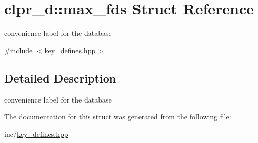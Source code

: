 \hypertarget{structclpr__d_1_1max__fds}{\section{clpr\-\_\-d\-:\-:max\-\_\-fds \-Struct \-Reference}
\label{structclpr__d_1_1max__fds}
}


convenience label for the database  




{\ttfamily \#include $<$key\-\_\-defines.\-hpp$>$}



\subsection{\-Detailed \-Description}
convenience label for the database 

\-The documentation for this struct was generated from the following file\-:\begin{DoxyCompactItemize}
\item 
inc/\hyperlink{key__defines_8hpp}{key\-\_\-defines.\-hpp}\end{DoxyCompactItemize}
